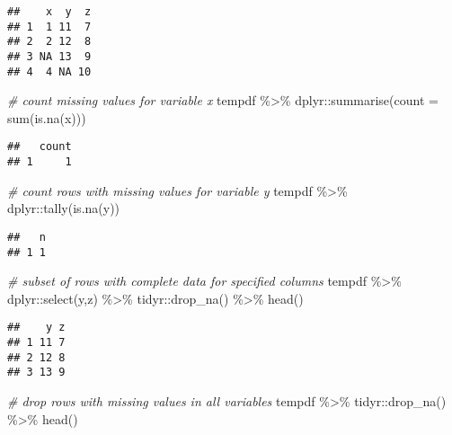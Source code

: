 \documentclass[
]{book}
\newenvironment{Shaded}{\begin{snugshade}}{\end{snugshade}}
\newcommand{\AttributeTok}[1]{\textcolor[rgb]{0.77,0.63,0.00}{#1}}
\newcommand{\CommentTok}[1]{\textcolor[rgb]{0.56,0.35,0.01}{\textit{#1}}}
\newcommand{\FunctionTok}[1]{\textcolor[rgb]{0.00,0.00,0.00}{#1}}
\newcommand{\NormalTok}[1]{#1}
\newcommand{\SpecialCharTok}[1]{\textcolor[rgb]{0.00,0.00,0.00}{#1}}
\begin{document}
\begin{verbatim}
##    x  y  z
## 1  1 11  7
## 2  2 12  8
## 3 NA 13  9
## 4  4 NA 10
\end{verbatim}

\begin{Shaded}
\begin{Highlighting}[]
\CommentTok{\# count missing values for variable x}
\NormalTok{tempdf }\SpecialCharTok{\%\textgreater{}\%}
\NormalTok{  dplyr}\SpecialCharTok{::}\FunctionTok{summarise}\NormalTok{(}\AttributeTok{count =} \FunctionTok{sum}\NormalTok{(}\FunctionTok{is.na}\NormalTok{(x)))}
\end{Highlighting}
\end{Shaded}

\begin{verbatim}
##   count
## 1     1
\end{verbatim}

\begin{Shaded}
\begin{Highlighting}[]
\CommentTok{\# count rows with missing values for variable y}
\NormalTok{tempdf }\SpecialCharTok{\%\textgreater{}\%}
\NormalTok{  dplyr}\SpecialCharTok{::}\FunctionTok{tally}\NormalTok{(}\FunctionTok{is.na}\NormalTok{(y))}
\end{Highlighting}
\end{Shaded}

\begin{verbatim}
##   n
## 1 1
\end{verbatim}

\begin{Shaded}
\begin{Highlighting}[]
\CommentTok{\# subset of rows with complete data for specified columns}
\NormalTok{tempdf }\SpecialCharTok{\%\textgreater{}\%}
\NormalTok{  dplyr}\SpecialCharTok{::}\FunctionTok{select}\NormalTok{(y,z) }\SpecialCharTok{\%\textgreater{}\%}
\NormalTok{  tidyr}\SpecialCharTok{::}\FunctionTok{drop\_na}\NormalTok{() }\SpecialCharTok{\%\textgreater{}\%}
  \FunctionTok{head}\NormalTok{()}
\end{Highlighting}
\end{Shaded}

\begin{verbatim}
##    y z
## 1 11 7
## 2 12 8
## 3 13 9
\end{verbatim}

\begin{Shaded}
\begin{Highlighting}[]
\CommentTok{\#   drop rows with missing values in all variables}
\NormalTok{tempdf }\SpecialCharTok{\%\textgreater{}\%}
\NormalTok{  tidyr}\SpecialCharTok{::}\FunctionTok{drop\_na}\NormalTok{() }\SpecialCharTok{\%\textgreater{}\%}
  \FunctionTok{head}\NormalTok{()}
\end{Highlighting}
\end{Shaded}
\end{document}
